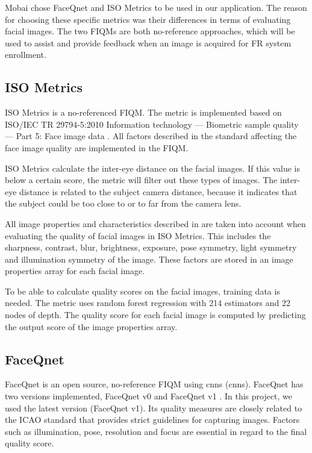 Mobai chose FaceQnet and ISO Metrics to be used in our application. The reason for choosing these specific metrics was their differences in terms of evaluating facial images. The two FIQMs are both no-reference approaches, which will be used to assist and provide feedback when an image is acquired for FR system enrollment. 

\subsection{ISO Metrics}
ISO Metrics is a no-referenced FIQM. The metric is implemented based on ISO/IEC TR 29794-5:2010 Information technology — Biometric sample quality — Part 5: Face image data \cite{ISO50912}. All factors described in the standard affecting the face image quality are implemented in the FIQM. 

ISO Metrics calculate the inter-eye distance on the facial images. If this value is below a certain score, the metric will filter out these types of images. The inter-eye distance is related to the subject camera distance, because it indicates that the subject could be too close to or to far from the camera lens. 

All image properties and characteristics described in \cite{ISO50912} are taken into account when evaluating the quality of facial images in ISO Metrics. This includes the sharpness, contrast, blur, brightness, exposure, pose symmetry, light symmetry and illumination symmetry of the image. These factors are stored in an image properties array for each facial image. 

To be able to calculate quality scores on the facial images, training data is needed. The metric uses random forest regression \cite{RandomForestRegressor} with 214 estimators and 22 nodes of depth. The quality score for each facial image is computed by predicting the output score of the image properties array.  

\subsection{FaceQnet}
FaceQnet \cite{FaceQnet} is an open source, no-reference FIQM using \acrlong{cnn}s (\acrshort{cnn}s). FaceQnet has two versions implemented, FaceQnet v0 \cite{hernandezortega2019faceqnet} and FaceQnet v1 \cite{hernandezortega2021biometric}. In this project, we used the latest version (FaceQnet v1). Its quality measures are closely related to the ICAO standard \cite{ICAO2} that provides strict guidelines for capturing images. Factors such as illumination, pose, resolution and focus are essential in regard to the final quality score.

